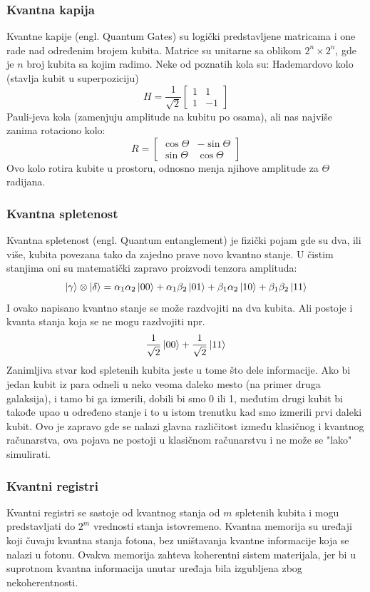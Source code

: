 \documentclass[12pt, letterpaper, oneside]{article}
\begin{document}
\subsubsection*{Kvantna kapija}
Kvantne kapije (engl. Quantum Gates) su logički predstavljene matricama i one rade nad određenim brojem kubita.
Matrice su unitarne sa oblikom $2^n \times 2^n$, gde je $n$ broj kubita sa kojim radimo. Neke od poznatih kola su: Hademardovo kolo (stavlja kubit u superpoziciju)
\[
    H = \frac{1}{\sqrt{2}}\begin{bmatrix}
        1 & 1 \\
        1 & -1
    \end{bmatrix}
\]
Pauli-jeva kola (zamenjuju amplitude na kubitu po osama), ali nas najviše zanima rotaciono kolo:
\[
    R = \begin{bmatrix}
        \cos{\Theta} & -\sin{\Theta} \\
        \sin{\Theta} & \cos{\Theta} 
    \end{bmatrix}
\]
Ovo kolo rotira kubite u prostoru, odnosno menja njihove amplitude za $\Theta$ radijana.
\subsubsection*{Kvantna spletenost}
Kvantna spletenost (engl. Quantum entanglement) je fizički pojam gde su dva, ili više, kubita povezana tako da zajedno prave novo kvantno stanje.
U čistim stanjima oni su matematički zapravo proizvodi tenzora amplituda:
\[
    \ket{\gamma} \otimes \ket{\delta} = \alpha_1\alpha_2\ket{00} + \alpha_1\beta_2\ket{01} + \beta_1\alpha_2\ket{10} + \beta_1\beta_2\ket{11}
\]
I ovako napisano kvantno stanje se može razdvojiti na dva kubita. Ali postoje i kvanta stanja koja se ne mogu razdvojiti npr.
\[
 \frac{1}{\sqrt{2}}\ket{00} + \frac{1}{\sqrt{2}}\ket{11}
\]
Zanimljiva stvar kod spletenih kubita jeste u tome što dele informacije. Ako bi jedan kubit iz para odneli u neko veoma daleko mesto (na primer druga galaksija),
i tamo bi ga izmerili, dobili bi smo 0 ili 1, međutim drugi kubit bi takođe upao u određeno stanje i to u istom trenutku kad smo izmerili prvi daleki kubit.
Ovo je zapravo gde se nalazi glavna različitost između klasičnog i kvantnog računarstva, ova pojava ne postoji u klasičnom računarstvu i ne može se "lako" simulirati.
\subsubsection*{Kvantni registri}
Kvantni registri se sastoje od kvantnog stanja od $m$ spletenih kubita i mogu predstavljati do $2^m$ vrednosti stanja istovremeno.
Kvantna memorija su uređaji koji čuvaju kvantna stanja fotona, bez uništavanja kvantne informacije koja se nalazi u fotonu.
Ovakva memorija zahteva koherentni sistem materijala, jer bi u suprotnom kvantna informacija unutar uređaja bila izgubljena zbog nekoherentnosti.
\end{document}
